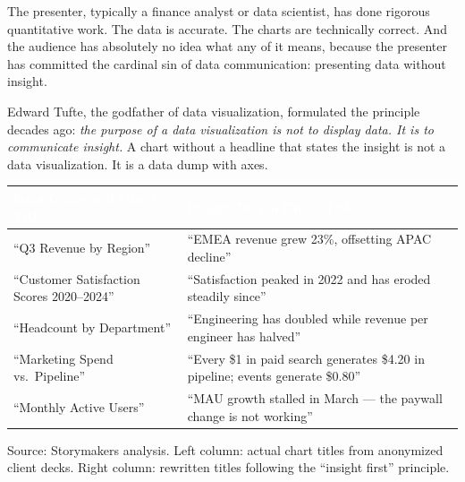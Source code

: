 The presenter, typically a finance analyst or data scientist, has done rigorous quantitative work. The data is accurate. The charts are technically correct. And the audience has absolutely no idea what any of it means, because the presenter has committed the cardinal sin of data communication: presenting data without insight.

Edward Tufte, the godfather of data visualization, formulated the principle decades ago: \emph{the purpose of a data visualization is not to display data. It is to communicate insight.} A chart without a headline that states the insight is not a data visualization. It is a data dump with axes.

\begin{center}
\begin{tabularx}{\textwidth}{>{\raggedright}p{6cm} >{\raggedright\arraybackslash}p{7.5cm}}
\toprule
\rowcolor{tableheader} \textcolor{white}{\textbf{Data Graveyard Chart Title}} & \textcolor{white}{\textbf{Insight-Driven Chart Title}} \\
\midrule
``Q3 Revenue by Region'' & ``EMEA revenue grew 23\%, offsetting APAC decline'' \\
\rowcolor{altrow}
``Customer Satisfaction Scores 2020--2024'' & ``Satisfaction peaked in 2022 and has eroded steadily since'' \\
``Headcount by Department'' & ``Engineering has doubled while revenue per engineer has halved'' \\
\rowcolor{altrow}
``Marketing Spend vs.\ Pipeline'' & ``Every \$1 in paid search generates \$4.20 in pipeline; events generate \$0.80'' \\
``Monthly Active Users'' & ``MAU growth stalled in March --- the paywall change is not working'' \\
\bottomrule
\end{tabularx}
\end{center}

\vspace{4pt}
{\small\color{slate}Source: Storymakers analysis. Left column: actual chart titles from anonymized client decks. Right column: rewritten titles following the ``insight first'' principle.}
\vspace{6pt}

